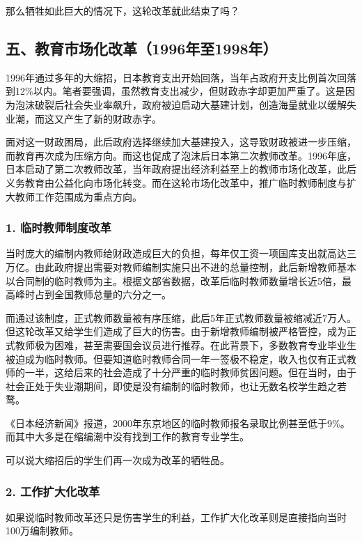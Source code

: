 那么牺牲如此巨大的情况下，这轮改革就此结束了吗？

\subsection{五、教育市场化改革（1996年至1998年）}

1996年通过多年的大缩招，日本教育支出开始回落，当年占政府开支比例首次回落到12\%以内。笔者要强调，虽然教育支出减少，但财政赤字却更加严重了。这是因为泡沫破裂后社会失业率飙升，政府被迫启动大基建计划，创造海量就业以缓解失业潮，而这又产生了新的财政赤字。

面对这一财政困局，此后政府选择继续加大基建投入，这导致财政被进一步压缩，而教育再次成为压缩方向。而这也促成了泡沫后日本第二次教师改革。1996年底，日本启动了第二次教师改革，当年政府提出经济利益至上的教师市场化改革，此后义务教育由公益化向市场化转变。而在这轮市场化改革中，推广临时教师制度与扩大教师工作范围成为重点方向。

\subsubsection{1. 临时教师制度改革}

当时庞大的编制内教师给财政造成巨大的负担，每年仅工资一项国库支出就高达三万亿。由此政府提出需要对教师编制实施只出不进的总量控制，此后新增教师基本以合同制的临时教师为主。根据文部省数据，改革后临时教师数量增长近5倍，最高峰时占到全国教师总量的六分之一。

而通过该制度，正式教师数量被有序压缩，此后5年正式教师数量被缩减近7万人。但这轮改革又给学生们造成了巨大的伤害。由于新增教师编制被严格管控，成为正式教师极为困难，甚至需要国会议员进行推荐。在此背景下，多数教育专业毕业生被迫成为临时教师。但要知道临时教师合同一年一签极不稳定，收入也仅有正式教师的一半，这给后来的社会造成了十分严重的临时教师贫困问题。但在当时，由于社会正处于失业潮期间，即使是没有编制的临时教师，也让无数名校学生趋之若鹜。

《日本经济新闻》报道，2000年东京地区的临时教师报名录取比例甚至低于9\%。而其中大多是在缩编潮中没有找到工作的教育专业学生。

可以说大缩招后的学生们再一次成为改革的牺牲品。

\subsubsection{2. 工作扩大化改革}

如果说临时教师改革还只是伤害学生的利益，工作扩大化改革则是直接指向当时100万编制教师。

